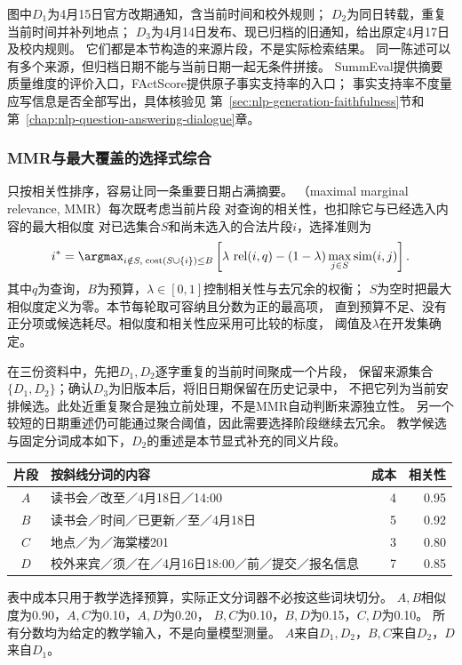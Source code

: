 图中$D_1$为4月15日官方改期通知，含当前时间和校外规则；
$D_2$为同日转载，重复当前时间并补列地点；
$D_3$为4月14日发布、现已归档的旧通知，给出原定4月17日及校内规则。
它们都是本节构造的来源片段，不是实际检索结果。
同一陈述可以有多个来源，但归档日期不能与当前日期一起无条件拼接。
SummEval提供摘要质量维度的评价入口，FActScore提供原子事实支持率的入口；
事实支持率不度量应写信息是否全部写出，具体核验见
第~\ref{sec:nlp-generation-faithfulness}节和第~\ref{chap:nlp-question-answering-dialogue}章。

\subsubsection{MMR与最大覆盖的选择式综合}
\label{sec:nlp-generation-mmr}

只按相关性排序，容易让同一条重要日期占满摘要。
（maximal marginal relevance, MMR）每次既考虑当前片段
对查询的相关性，也扣除它与已经选入内容的最大相似度
对已选集合$S$和尚未选入的合法片段$i$，选择准则为
\begin{equation}
  i^*=\argmax_{i\notin S,\;\operatorname{cost}(S\cup\{i\})\leq B}
  \left[\lambda\,\operatorname{rel}(i,q)
  -(1-\lambda)\max_{j\in S}\operatorname{sim}(i,j)\right].
  \label{eq:nlp-generation-mmr}
\end{equation}
其中$q$为查询，$B$为预算，$\lambda\in[0,1]$控制相关性与去冗余的权衡；
$S$为空时把最大相似度定义为零。本节每轮取可容纳且分数为正的最高项，
直到预算不足、没有正分项或候选耗尽。相似度和相关性应采用可比较的标度，
阈值及$\lambda$在开发集确定。

在三份资料中，先把$D_1,D_2$逐字重复的当前时间聚成一个片段，
保留来源集合$\{D_1,D_2\}$；确认$D_3$为旧版本后，将旧日期保留在历史记录中，
不把它列为当前安排候选。此处近重复聚合是独立前处理，不是MMR自动判断来源独立性。
另一个较短的日期重述仍可能通过聚合阈值，因此需要选择阶段继续去冗余。
教学候选与固定分词成本如下，$D_2$的重述是本节显式补充的同义片段。

\begin{fullwidth}
\begin{center}
  \begin{tabular}{@{}clrr@{}}
    \toprule
    片段 & 按斜线分词的内容 & 成本 & 相关性\\
    \midrule
    $A$ & 读书会／改至／4月18日／14:00 & 4 & 0.95\\
    $B$ & 读书会／时间／已更新／至／4月18日 & 5 & 0.92\\
    $C$ & 地点／为／海棠楼201 & 3 & 0.80\\
    $D$ & 校外来宾／须／在／4月16日18:00／前／提交／报名信息 & 7 & 0.85\\
    \bottomrule
  \end{tabular}
\end{center}
\end{fullwidth}
表中成本只用于教学选择预算，实际正文分词器不必按这些词块切分。
$A,B$相似度为0.90，$A,C$为0.10，$A,D$为0.20，
$B,C$为0.10，$B,D$为0.15，$C,D$为0.10。
所有分数均为给定的教学输入，不是向量模型测量。
$A$来自$D_1,D_2$，$B,C$来自$D_2$，$D$来自$D_1$。

